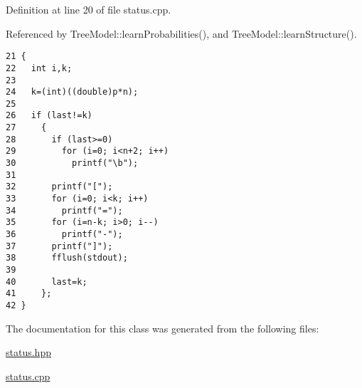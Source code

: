 Definition at line 20 of file status.cpp.

Referenced by Tree\-Model::learn\-Probabilities(), and Tree\-Model::learn\-Structure().

\begin{Code}\begin{verbatim}21 {
22   int i,k;
23 
24   k=(int)((double)p*n);
25 
26   if (last!=k)
27     {
28       if (last>=0)
29         for (i=0; i<n+2; i++)
30           printf("\b");
31       
32       printf("[");
33       for (i=0; i<k; i++)
34         printf("=");
35       for (i=n-k; i>0; i--)
36         printf("-");
37       printf("]");
38       fflush(stdout);
39       
40       last=k;
41     };
42 }
\end{verbatim}\end{Code}




The documentation for this class was generated from the following files:\begin{CompactItemize}
\item 
\hyperlink{status_8hpp}{status.hpp}\item 
\hyperlink{status_8cpp}{status.cpp}\end{CompactItemize}
